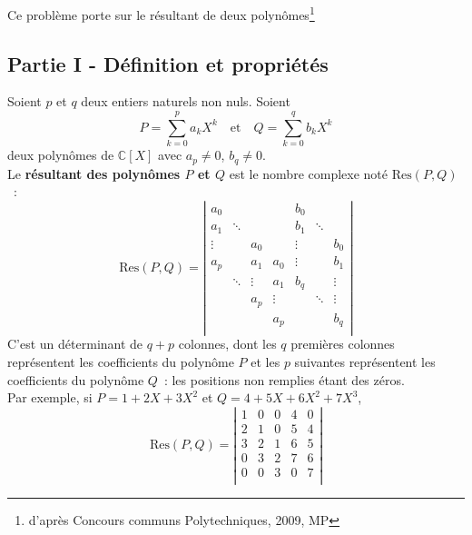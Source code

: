 Ce problème porte sur le résultant de deux polynômes\footnote{d'après Concours communs Polytechniques, 2009, MP}

\subsection*{Partie I - Définition et propriétés}

Soient $p$ et $q$ deux entiers naturels non nuls. Soient
\[ P = \sum\limits_{k=0}^{p} a_k X^k \quad \text{et} \quad Q=\sum\limits_{k=0}^{q} b_k X^k \] deux polynômes de $\mathbb{C}[X]$ avec $a_p \neq 0$, $b_q \neq 0$. \\
Le \textbf{résultant des polynômes $P$ et $Q$} est le nombre complexe noté $\text{Res}(P,Q)$~:
\[ \text{Res}(P,Q) = \left|
                       \begin{array}{ccccccc}
                         a_0    &      &      &      & b_0  &  &  \\
                         a_1    &\ddots&      &      & b_1  & \ddots &  \\
                         \vdots &      & a_0  &      &\vdots&  & b_0 \\
                         a_p    &      & a_1  & a_0  &\vdots&  & b_1 \\
                                &\ddots&\vdots& a_1  & b_q  &  & \vdots \\
                                &      & a_p  &\vdots&      &\ddots& \vdots \\
                                &      &      & a_p  &      &      & b_q \\
                       \end{array}
                     \right| \]
C'est un déterminant de $q+p$ colonnes, dont les $q$ premières colonnes représentent les coefficients du polynôme $P$ et les $p$ suivantes représentent les coefficients du polynôme $Q$~: les positions non remplies étant des zéros. \\
Par exemple, si $P=1+2X+3X^2$ et $Q=4+5X+6X^2+7X^3$,
\[ \text{Res}(P,Q) = \left|
                       \begin{array}{ccccc}
                         1 & 0 & 0 & 4 & 0 \\
                         2 & 1 & 0 & 5 & 4 \\
                         3 & 2 & 1 & 6 & 5 \\
                         0 & 3 & 2 & 7 & 6 \\
                         0 & 0 & 3 & 0 & 7 \\
                       \end{array}
                     \right| \]
